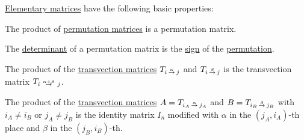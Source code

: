 \begin{proposition}\label{thm:def:elementary_matrix}
  \hyperref[def:elementary_matrix]{Elementary matrices} have the following basic properties:
  \begin{thmenum}
     The product of \hyperref[def:elementary_matrix/permutation]{permutation matrices} is a permutation matrix.

     The \hyperref[def:matrix_determinant]{determinant} of a permutation matrix is the \hyperref[def:permutation_parity]{sign} of the \hyperref[def:symmetric_group/permutation]{permutation}.

     The product of the \hyperref[def:elementary_matrix/transvection]{transvection matrices} \( T_{i \reloset \alpha \to j} \) and \( T_{i \reloset \beta \to j} \) is the transvection matrix \( T_{i \reloset {\alpha + \beta} \to j} \).

     The product of the \hyperref[def:elementary_matrix/transvection]{transvection matrices} \( A = T_{i_A \reloset \alpha \to j_A} \) and \( B = T_{i_B \reloset \beta \to j_B} \) with \( i_A \neq i_B \) or \( j_A \neq j_B \) is the identity matrix \( I_n \) modified with \( \alpha \) in the \( (j_A, i_A) \)-th place and \( \beta \) in the \( (j_B, i_B) \)-th.
  \end{thmenum}
\end{proposition}
